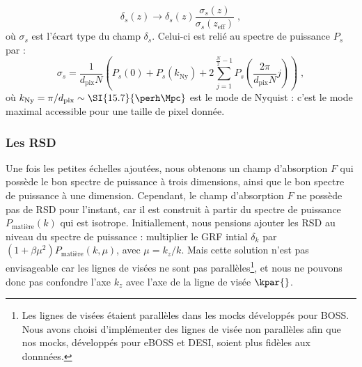   \begin{equation}
    \delta_s(z) \rightarrow \delta_s(z) \frac{\sigma_s(z)}{\sigma_s(z_{\mathrm{eff}})} \; ,
  \end{equation}
  où $\sigma_s$ est l'écart type du champ $\delta_s$. Celui-ci est relié au spectre de puissance $P_{s}$ par :
  \begin{equation}
    \label{eq:sigma_s}
    \sigma_s = \frac{1}{d_{\mathrm{pix}}N} \left( P_{s}(0) + P_{s}(k_{\mathrm{Ny}}) + 2 \sum_{j=1}^{\frac{N}{2} - 1}P_{s}\left(\frac{2 \pi}{d_{\mathrm{pix}}N} j\right)\right) \; ,
  \end{equation}
  où $k_{\mathrm{Ny}} = \pi / d_{\mathrm{pix}} \sim \SI{15.7}{\perh\Mpc}$ est le mode de Nyquist : c'est le mode maximal accessible pour une taille de pixel donnée.


\subsubsection{Les RSD}
\label{subsubsec:rsdlya}
Une fois les petites échelles ajoutées, nous obtenons un champ d'absorption $F$ qui possède le bon spectre de puissance à trois dimensions, ainsi que le bon spectre de puissance à une dimension.
Cependant, le champ d'absorption $F$ ne possède pas de RSD pour l'instant, car il est construit à partir du spectre de puissance $P_{\mathrm{matière}}(k)$ qui est isotrope.
Initiallement, nous pensions ajouter les RSD au niveau du spectre de puissance : multiplier le GRF intial $\delta_k$ par $(1 + \beta \mu^2)P_{\mathrm{matière}}(k, \mu)$, avec $\mu = k_z / k$.
Mais cette solution n'est pas envisageable car les lignes de visées ne sont pas parallèles\footnote{Les lignes de visées étaient parallèles dans les mocks développés pour BOSS. Nous avons choisi d'implémenter des lignes de visée non parallèles afin que nos mocks, développés pour eBOSS et DESI, soient plus fidèles aux donnnées.}, et nous ne pouvons donc pas confondre l'axe $k_z$ avec l'axe de la ligne de visée $\kpar{}$.

